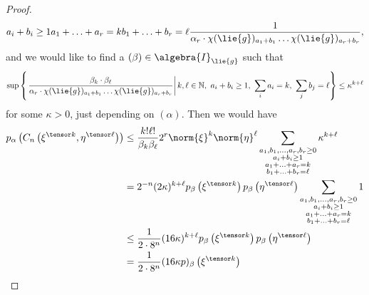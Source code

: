 \begin{proof}
\begin{equation*}
{{        		a_i + b_i \geq 1 \\
        		a_1 + \ldots + a_r = k \\
        		b_1 + \ldots + b_r = \ell
       	}}
       	\frac{1}
       	{
       		\alpha_r
       		\cdot
       		\chi(\lie{g})_{a_1 + b_1}
       		\ldots
       		\chi(\lie{g})_{a_r + b_r}
       	},
	\end{equation*}
	and we would like to find a $(\beta) \in \algebra{I}_{\lie{g}}$ such that
	\begin{equation}
		\label{Nilpot:SavingSequence}
		\sup
		\left\{
		\left.
			\frac{\beta_k \cdot \beta_{\ell}}
	       	{
	       		\alpha_r
	       		\cdot
	       		\chi(\lie{g})_{a_1 + b_1}
	       		\ldots
	       		\chi(\lie{g})_{a_r + b_r}
	       	}
	    \right|
	    		k, \ell \in \mathbb{N},\
	    		a_i + b_i \geq 1,\
        		\sum_i a_i = k,\
        		\sum_j b_j = \ell
		\right\}
		\leq
		\kappa^{k + \ell}
	\end{equation}
	for some $\kappa > 0$, just depending on $(\alpha)$. Then we would have
	\begin{align*}
		p_{\alpha} \left(
			C_n\left( \xi^{\tensor k}, \eta^{\tensor \ell} \right)
		\right)
		& \leq
    		\frac{k! \ell!}{\beta_k \beta_{\ell}} 
    		2^r
    		\norm{\xi}^k
       	\norm{\eta}^{\ell}
    		\sum\limits_{\substack{a_1, b_1, \ldots, a_r, b_r \geq 0 \\
        		a_i + b_i \geq 1 \\
        		a_1 + \ldots + a_r = k \\
        		b_1 + \ldots + b_r = \ell
       	}}
       	\kappa^{k + \ell}
       	\\
       	& =
       	2^{-n}
       	(2 \kappa)^{k + \ell}
       	p_{\beta}
       	\left( \xi^{\tensor k} \right)
       	p_{\beta}
       	\left( \eta^{\tensor \ell} \right)
       	\sum\limits_{\substack{a_1, b_1, \ldots, a_r, b_r \geq 0 \\
        		a_i + b_i \geq 1 \\
        		a_1 + \ldots + a_r = k \\
        		b_1 + \ldots + b_r = \ell
       	}}
       	1
       	\\
       	& \leq
       	\frac{1}{2 \cdot 8^n} 
       	(16 \kappa)^{k + \ell}
       	p_{\beta}
       	\left( \xi^{\tensor k} \right)
       	p_{\beta}
       	\left( \eta^{\tensor \ell} \right)
       	\\ 
       	& =
       	\frac{1}{2 \cdot 8^n} 
       	(16 \kappa p)_{\beta}
       	\left( \xi^{\tensor k} \right)

\end{align*}
\end{proof}
